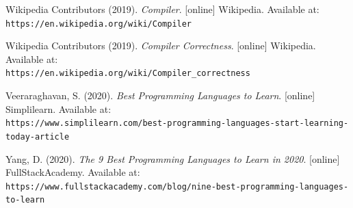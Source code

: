 \documentclass[
]{report}
\begin{document}
\begin{thebibliography}{24}
	Wikipedia Contributors (2019).
	\textit{Compiler}.
	[online] Wikipedia. Available at:
	\\\texttt{https://en.wikipedia.org/wiki/Compiler}
	
	Wikipedia Contributors (2019).
	\textit{Compiler Correctness}.
	[online] Wikipedia. Available at:
	\\\texttt{https://en.wikipedia.org/wiki/Compiler\_correctness}
	
	Veeraraghavan, S. (2020).
	\textit{Best Programming Languages to Learn}.
	[online] Simplilearn. Available at:
	\\\texttt{https://www.simplilearn.com/best-programming-languages-start-learning-today-article}
	
	Yang, D. (2020).
	\textit{The 9 Best Programming Languages to Learn in 2020}.
	[online] FullStackAcademy. Available at:
	\\\texttt{https://www.fullstackacademy.com/blog/nine-best-programming-languages-to-learn}

\end{thebibliography}

\printglossary
\end{document}

